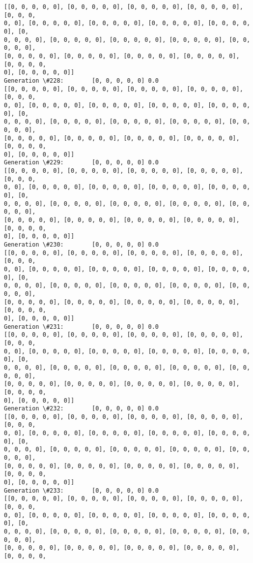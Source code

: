 \documentclass[11pt]{article}
\begin{document}
\begin{Verbatim}[commandchars=\\\{\}]
[[0, 0, 0, 0, 0], [0, 0, 0, 0, 0], [0, 0, 0, 0, 0], [0, 0, 0, 0, 0], [0, 0, 0,
0, 0], [0, 0, 0, 0, 0], [0, 0, 0, 0, 0], [0, 0, 0, 0, 0], [0, 0, 0, 0, 0], [0,
0, 0, 0, 0], [0, 0, 0, 0, 0], [0, 0, 0, 0, 0], [0, 0, 0, 0, 0], [0, 0, 0, 0, 0],
[0, 0, 0, 0, 0], [0, 0, 0, 0, 0], [0, 0, 0, 0, 0], [0, 0, 0, 0, 0], [0, 0, 0, 0,
0], [0, 0, 0, 0, 0]]
Generation \#228:        [0, 0, 0, 0, 0] 0.0
[[0, 0, 0, 0, 0], [0, 0, 0, 0, 0], [0, 0, 0, 0, 0], [0, 0, 0, 0, 0], [0, 0, 0,
0, 0], [0, 0, 0, 0, 0], [0, 0, 0, 0, 0], [0, 0, 0, 0, 0], [0, 0, 0, 0, 0], [0,
0, 0, 0, 0], [0, 0, 0, 0, 0], [0, 0, 0, 0, 0], [0, 0, 0, 0, 0], [0, 0, 0, 0, 0],
[0, 0, 0, 0, 0], [0, 0, 0, 0, 0], [0, 0, 0, 0, 0], [0, 0, 0, 0, 0], [0, 0, 0, 0,
0], [0, 0, 0, 0, 0]]
Generation \#229:        [0, 0, 0, 0, 0] 0.0
[[0, 0, 0, 0, 0], [0, 0, 0, 0, 0], [0, 0, 0, 0, 0], [0, 0, 0, 0, 0], [0, 0, 0,
0, 0], [0, 0, 0, 0, 0], [0, 0, 0, 0, 0], [0, 0, 0, 0, 0], [0, 0, 0, 0, 0], [0,
0, 0, 0, 0], [0, 0, 0, 0, 0], [0, 0, 0, 0, 0], [0, 0, 0, 0, 0], [0, 0, 0, 0, 0],
[0, 0, 0, 0, 0], [0, 0, 0, 0, 0], [0, 0, 0, 0, 0], [0, 0, 0, 0, 0], [0, 0, 0, 0,
0], [0, 0, 0, 0, 0]]
Generation \#230:        [0, 0, 0, 0, 0] 0.0
[[0, 0, 0, 0, 0], [0, 0, 0, 0, 0], [0, 0, 0, 0, 0], [0, 0, 0, 0, 0], [0, 0, 0,
0, 0], [0, 0, 0, 0, 0], [0, 0, 0, 0, 0], [0, 0, 0, 0, 0], [0, 0, 0, 0, 0], [0,
0, 0, 0, 0], [0, 0, 0, 0, 0], [0, 0, 0, 0, 0], [0, 0, 0, 0, 0], [0, 0, 0, 0, 0],
[0, 0, 0, 0, 0], [0, 0, 0, 0, 0], [0, 0, 0, 0, 0], [0, 0, 0, 0, 0], [0, 0, 0, 0,
0], [0, 0, 0, 0, 0]]
Generation \#231:        [0, 0, 0, 0, 0] 0.0
[[0, 0, 0, 0, 0], [0, 0, 0, 0, 0], [0, 0, 0, 0, 0], [0, 0, 0, 0, 0], [0, 0, 0,
0, 0], [0, 0, 0, 0, 0], [0, 0, 0, 0, 0], [0, 0, 0, 0, 0], [0, 0, 0, 0, 0], [0,
0, 0, 0, 0], [0, 0, 0, 0, 0], [0, 0, 0, 0, 0], [0, 0, 0, 0, 0], [0, 0, 0, 0, 0],
[0, 0, 0, 0, 0], [0, 0, 0, 0, 0], [0, 0, 0, 0, 0], [0, 0, 0, 0, 0], [0, 0, 0, 0,
0], [0, 0, 0, 0, 0]]
Generation \#232:        [0, 0, 0, 0, 0] 0.0
[[0, 0, 0, 0, 0], [0, 0, 0, 0, 0], [0, 0, 0, 0, 0], [0, 0, 0, 0, 0], [0, 0, 0,
0, 0], [0, 0, 0, 0, 0], [0, 0, 0, 0, 0], [0, 0, 0, 0, 0], [0, 0, 0, 0, 0], [0,
0, 0, 0, 0], [0, 0, 0, 0, 0], [0, 0, 0, 0, 0], [0, 0, 0, 0, 0], [0, 0, 0, 0, 0],
[0, 0, 0, 0, 0], [0, 0, 0, 0, 0], [0, 0, 0, 0, 0], [0, 0, 0, 0, 0], [0, 0, 0, 0,
0], [0, 0, 0, 0, 0]]
Generation \#233:        [0, 0, 0, 0, 0] 0.0
[[0, 0, 0, 0, 0], [0, 0, 0, 0, 0], [0, 0, 0, 0, 0], [0, 0, 0, 0, 0], [0, 0, 0,
0, 0], [0, 0, 0, 0, 0], [0, 0, 0, 0, 0], [0, 0, 0, 0, 0], [0, 0, 0, 0, 0], [0,
0, 0, 0, 0], [0, 0, 0, 0, 0], [0, 0, 0, 0, 0], [0, 0, 0, 0, 0], [0, 0, 0, 0, 0],
[0, 0, 0, 0, 0], [0, 0, 0, 0, 0], [0, 0, 0, 0, 0], [0, 0, 0, 0, 0], [0, 0, 0, 0,

\end{Verbatim}
\end{document}
